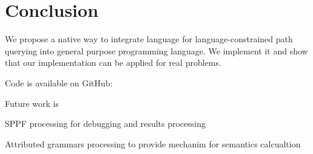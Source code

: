 \section{Conclusion}

We propose a native way to integrate language for language-constrained path querying into general purpose 
programming language. We implement it and show that our implementation can be applied for real 
problems.

Code is available on GitHub: 

Future work is

SPPF processing for debugging and results processing

Attributed grammars processing to provide mechanim for semantics calcualtion